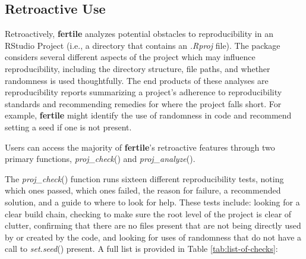 \documentclass[APA,LATO1COL]{WileyNJD-v2}\usepackage[]{graphicx}\usepackage[]{color}
\newcommand{\cmd}[1]{\textit{#1}}
\newcommand{\pkg}[1]{\textbf{#1}}
\newcommand{\func}[1]{\textit{#1}()}
\begin{document}
\subsection{Retroactive Use}

Retroactively, \pkg{fertile} analyzes potential obstacles to reproducibility in an RStudio Project (i.e., a directory that contains an \cmd{.Rproj} file). The package considers several different aspects of the project which may influence reproducibility, including the directory structure, file paths, and whether randomness is used thoughtfully.
The end products of these analyses are reproducibility reports summarizing a project's adherence to reproducibility standards and recommending remedies for where the project falls short. For example, \pkg{fertile} might identify the use of randomness in code and recommend setting a seed if one is not present.

Users can access the majority of \pkg{fertile}'s retroactive features through two primary functions, \func{proj\_check} and \func{proj\_analyze}. 

The \func{proj\_check} function runs sixteen different reproducibility tests, noting which ones passed, which ones failed, the reason for failure, a recommended solution, and a guide to where to look for help. These tests include: looking for a clear build chain, checking to make sure the root level of the project is clear of clutter, confirming that there are no files present that are not being directly used by or created by the code, and looking for uses of randomness that do not have a call to \func{set.seed} present. A full list is provided in Table \ref{tab:list-of-checks}:

\vspace{2mm}
\end{document}
